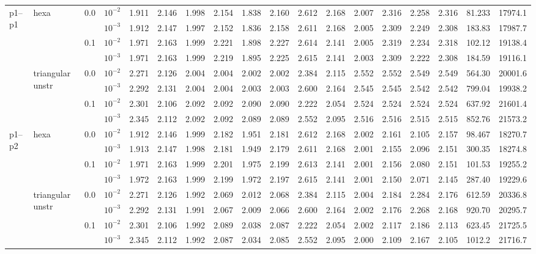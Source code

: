 \begin{longtable}{llclrrrrrrrrrrrrrr}
\multirow{8}{*}{p1--p1} & \multirow{4}{*}{hexa} & \multirow{2}{*}{0.0} & $10^{-2}$ & 1.911 & 2.146 & 1.998 & 2.154 & 1.838 & 2.160 & 2.612 & 2.168 & 2.007 & 2.316 & 2.258 & 2.316 & 81.233 & 17974.1 \\
& & & $10^{-3}$ & 1.912 & 2.147 & 1.997 & 2.152 & 1.836 & 2.158 & 2.611 & 2.168 & 2.005 & 2.309 & 2.249 & 2.308 & 183.83 & 17987.7 \\\cline{3-18}
& & \multirow{2}{*}{0.1} & $10^{-2}$ & 1.971 & 2.163 & 1.999 & 2.221 & 1.898 & 2.227 & 2.614 & 2.141 & 2.005 & 2.319 & 2.234 & 2.318 & 102.12 & 19138.4 \\
& & & $10^{-3}$ & 1.971 & 2.163 & 1.999 & 2.219 & 1.895 & 2.225 & 2.615 & 2.141 & 2.003 & 2.309 & 2.222 & 2.308 & 184.59 & 19116.1 \\\cline{2-18}
& \multirow{4}{*}{triangular unstr} & \multirow{2}{*}{0.0} & $10^{-2}$ & 2.271 & 2.126 & 2.004 & 2.004 & 2.002 & 2.002 & 2.384 & 2.115 & 2.552 & 2.552 & 2.549 & 2.549 & 564.30 & 20001.6 \\
& & & $10^{-3}$ & 2.292 & 2.131 & 2.004 & 2.004 & 2.003 & 2.003 & 2.600 & 2.164 & 2.545 & 2.545 & 2.542 & 2.542 & 799.04 & 19938.2 \\\cline{3-18}
& & \multirow{2}{*}{0.1} & $10^{-2}$ & 2.301 & 2.106 & 2.092 & 2.092 & 2.090 & 2.090 & 2.222 & 2.054 & 2.524 & 2.524 & 2.524 & 2.524 & 637.92 & 21601.4 \\
& & & $10^{-3}$ & 2.345 & 2.112 & 2.092 & 2.092 & 2.089 & 2.089 & 2.552 & 2.095 & 2.516 & 2.516 & 2.515 & 2.515 & 852.76 & 21573.2 \\\hline

\multirow{8}{*}{p1--p2} & \multirow{4}{*}{hexa} & \multirow{2}{*}{0.0} & $10^{-2}$ & 1.912 & 2.146 & 1.999 & 2.182 & 1.951 & 2.181 & 2.612 & 2.168 & 2.002 & 2.161 & 2.105 & 2.157 & 98.467 & 18270.7 \\
& & & $10^{-3}$ & 1.913 & 2.147 & 1.998 & 2.181 & 1.949 & 2.179 & 2.611 & 2.168 & 2.001 & 2.155 & 2.096 & 2.151 & 300.35 & 18274.8 \\\cline{3-18}
& & \multirow{2}{*}{0.1} & $10^{-2}$ & 1.971 & 2.163 & 1.999 & 2.201 & 1.975 & 2.199 & 2.613 & 2.141 & 2.001 & 2.156 & 2.080 & 2.151 & 101.53 & 19255.2 \\
& & & $10^{-3}$ & 1.972 & 2.163 & 1.999 & 2.199 & 1.972 & 2.197 & 2.615 & 2.141 & 2.001 & 2.150 & 2.071 & 2.145 & 287.40 & 19229.6 \\\cline{2-18}
& \multirow{4}{*}{triangular unstr} & \multirow{2}{*}{0.0} & $10^{-2}$ & 2.271 & 2.126 & 1.992 & 2.069 & 2.012 & 2.068 & 2.384 & 2.115 & 2.004 & 2.184 & 2.284 & 2.176 & 612.59 & 20336.8 \\
& & & $10^{-3}$ & 2.292 & 2.131 & 1.991 & 2.067 & 2.009 & 2.066 & 2.600 & 2.164 & 2.002 & 2.176 & 2.268 & 2.168 & 920.70 & 20295.7 \\\cline{3-18}
& & \multirow{2}{*}{0.1} & $10^{-2}$ & 2.301 & 2.106 & 1.992 & 2.089 & 2.038 & 2.087 & 2.222 & 2.054 & 2.002 & 2.117 & 2.186 & 2.113 & 623.45 & 21725.5 \\
& & & $10^{-3}$ & 2.345 & 2.112 & 1.992 & 2.087 & 2.034 & 2.085 & 2.552 & 2.095 & 2.000 & 2.109 & 2.167 & 2.105 & 1012.2 & 21716.7 \\\hline


\end{longtable}
